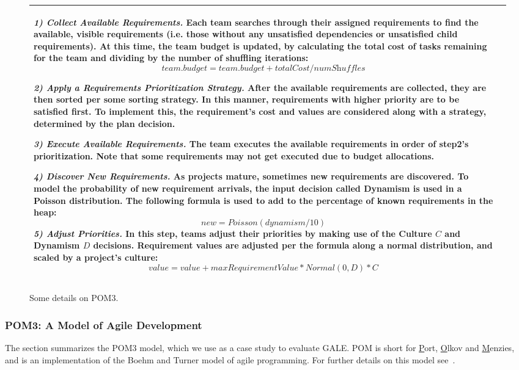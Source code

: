 \documentclass[10pt,journal,compsoc]{IEEEtran}
\begin{document}
\begin{figure*}[!b]
\begin{center}
\begin{tabular}{|p{.48\linewidth}|p{.48\linewidth}|}
    {\em 1) Collect Available Requirements.} Each team searches through
    their assigned requirements to find the available, visible
    requirements (i.e. those without any  unsatisfied dependencies
    or unsatisfied child requirements).  At this time, the team budget
    is updated, by calculating the total cost of tasks remaining for the
    team and dividing by the number of shuffling iterations:
    \[\textit{team.budget} = \textit{team.budget} + \textit{totalCost/numShuffles}\]
    
    {\em 2) Apply a Requirements Prioritization Strategy.}  After the
    available requirements are collected, they are then sorted per some
    sorting strategy. In this manner, requirements with higher priority
    are to be satisfied first. To implement this, the requirement's cost
    and values are considered along with a strategy, determined by the
    plan decision.
    
    {\em 3) Execute Available Requirements.} The team executes the
    available requirements in order of step2's prioritization.
    Note that some requirements may not get executed due to budget allocations.
    
    {\em 4) Discover New Requirements.} As projects mature, sometimes new requirements are discovered.  To model the probability of new requirement arrivals, the input decision called Dynamism is used in a Poisson distribution.  
    The following formula  is used to add to the percentage of known requirements in the heap:
    \begin{equation}\label{eq:dymn}
    \textit{new} = \textit{Poisson}\left(\textit{dynamism}/10\right)
    \end{equation}
    {\em 5) Adjust Priorities.} In this step, teams adjust their priorities by making use of the Culture $C$ and Dynamism 
    $D$ decisions.  Requirement values are adjusted per the formula along a normal distribution, and scaled by a project’s culture:
    \[
    \textit{value} = \textit{value} + \textit{maxRequirementValue}*\textit{Normal}(0, D)*C
    \]\\\hline
\end{tabular}
\end{center}
\caption{Some details on POM3.}\label{fig:pom3details}
\end{figure*}

\subsubsection{POM3: A Model of Agile Development}
The section summarizes the  POM3 model, which we 
use as a case study to evaluate GALE.
POM is short for \underline{P}ort,
\underline{O}lkov and \underline{M}enzies, and is an
implementation of the Boehm and Turner model of
agile programming. For further
details on this model see~\cite{port08,1204376,turner03}.
\end{document}
